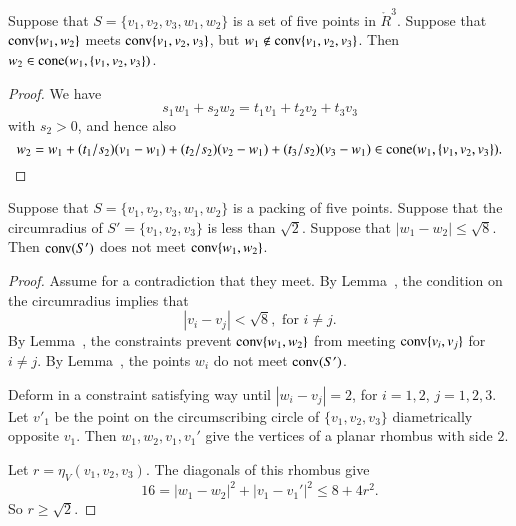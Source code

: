 \begin{tarskidata}
\begin{tarski}
\begin{lemma}
Suppose that $S=\{v_1,v_2,v_3,w_1,w_2\}$
is a set of five points in  $\ring{R}^3$.  Suppose
that  ${\operatorname{conv}}\{w_1,w_2\}$ meets ${\operatorname{conv}}\{v_1,v_2,v_3\}$,
but $w_1\not\in{\operatorname{conv}}\{v_1,v_2,v_3\}$.
Then $w_2\in{\operatorname{cone}}(w_1,\{v_1,v_2,v_3\})$.
\end{lemma}

\begin{proof}
We have 
  $$
  s_1 w_1 + s_2 w_2 = t_1 v_1 + t_2 v_2 + t_3 v_3
  $$
with $s_2>0$,
and hence also
  $$
  w_2 = w_1 + (t_1/s_2) (v_1-w_1) + 
       (t_2/s_2) (v_2 - w_1) + (t_3/s_2) (v_3-w_1)\in 
   {\operatorname{cone}}(w_1,\{v_1,v_2,v_3\}).
  $$
\end{proof}
\end{tarski}





\begin{tarski}

\begin{lemma}
Suppose that  $S=\{v_1,v_2,v_3,w_1,w_2\}$
is a packing of five points.
Suppose that the circumradius of $S'=\{v_1,v_2,v_3\}$ is less than
$\sqrt2$.  Suppose that $|w_1-w_2|\le \sqrt8$.  Then
${\operatorname{conv}}(S')$ does not meet ${\operatorname{conv}}\{w_1,w_2\}$.
\end{lemma}

\begin{proof}  Assume for a contradiction that they meet. 
By Lemma~, the condition on the circumradius implies that
	$$|v_i-v_j| < \sqrt8, \text{ for } i\ne j.$$
By Lemma~, the constraints prevent 	${\operatorname{conv}}\{w_1,w_2\}$
from meeting ${\operatorname{conv}}\{v_i,v_j\}$ for $i\ne j$.  By Lemma~,
the points $w_i$ do not meet ${\operatorname{conv}}(S')$.

Deform in a constraint satisfying way until $|w_i-v_j|=2$, for
$i=1,2$, $j=1,2,3$.    Let $v'_1$ be the
point on the circumscribing circle of $\{v_1,v_2,v_3\}$ diametrically
opposite $v_1$.  Then $w_1,w_2,v_1,v_1'$ give the vertices of a planar
rhombus with side $2$.

Let $r=\eta_V(v_1,v_2,v_3)$. The diagonals of this rhombus give
   $$
   16 = |w_1-w_2|^2 + |v_1-v_1'|^2 \le 8 + 4 r^2.
   $$
So $r\ge\sqrt2$.
\end{proof}
\end{tarski}









\end{tarskidata}
